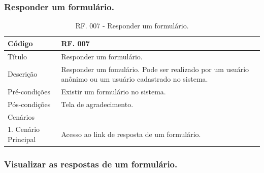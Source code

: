 \documentclass[11pt]{article}
\begin{document}
    \clearpage

      \subsubsection{Responder um formulário.}

        \begin{table}[h]
          \begin{center}
            \begin{tabular}{ | p{5cm} | p{10cm} | }
              \hline
              Código\cellcolor{gray} & RF. 007\cellcolor{gray} \\
              \hline
              Título & Responder um formulário. \\
              \hline
              Descrição & Responder um fomulário. Pode ser realizado por um usuário anônimo ou um usuário cadastrado no sistema. \\
              \hline
              Pré-condições & Existir um formulário no sistema. \\
              \hline
              Pós-condições & Tela de agradecimento. \\
              \hline
              Cenários &   \\
              \hline
              1.  Cenário Principal & Acesso ao link de resposta de um formulário. \\
              \hline
            \end{tabular}
            \caption{RF. 007 - Responder um formulário.}
          \end{center}
        \end{table}
    
      \subsubsection{Visualizar as respostas de um formulário.}
\end{document}
